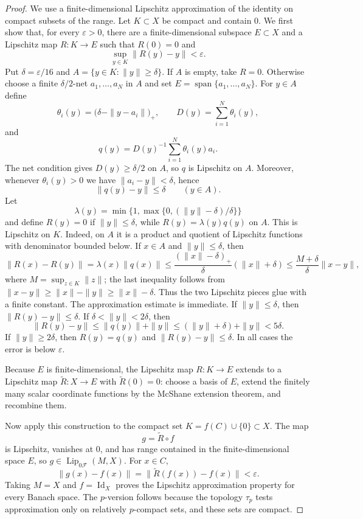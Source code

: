 \documentclass[11pt]{article}
\newcommand{\LipF}{\operatorname{Lip}_{0\mathcal F}}
\begin{document}
\begin{proof}
We use a finite-dimensional Lipschitz approximation of the identity on compact
subsets of the range. Let $K\subset X$ be compact and contain $0$. We first
show that, for every $\varepsilon>0$, there are a finite-dimensional subspace
$E\subset X$ and a Lipschitz map $R:K\to E$ such that $R(0)=0$ and
\[
        \sup_{y\in K}\|R(y)-y\|<\varepsilon .
\]
Put $\delta=\varepsilon/16$ and $A=\{y\in K:\|y\|\geq \delta\}$. If $A$ is
empty, take $R=0$. Otherwise choose a finite $\delta/2$-net
$a_1,\ldots,a_N$ in $A$ and set $E=\operatorname{span}\{a_1,\ldots,a_N\}$.
For $y\in A$ define
\[
 \theta_i(y)=\bigl(\delta-\|y-a_i\|\bigr)_+,\qquad
 D(y)=\sum_{i=1}^N\theta_i(y),
\]
and
\[
 q(y)=D(y)^{-1}\sum_{i=1}^N\theta_i(y)a_i .
\]
The net condition gives $D(y)\geq \delta/2$ on $A$, so $q$ is Lipschitz on
$A$. Moreover, whenever $\theta_i(y)>0$ we have $\|a_i-y\|<\delta$, hence
\[
        \|q(y)-y\|\leq \delta\qquad (y\in A).
\]
Let
\[
 \lambda(y)=\min\{1,\max\{0,(\|y\|-\delta)/\delta\}\}
\]
and define $R(y)=0$ if $\|y\|\leq\delta$, while $R(y)=\lambda(y)q(y)$ on
$A$. This is Lipschitz on $K$. Indeed, on $A$ it is a product and quotient of
Lipschitz functions with denominator bounded below. If $x\in A$ and
$\|y\|\leq\delta$, then
\[
 \|R(x)-R(y)\|=\lambda(x)\|q(x)\|
 \leq \frac{(\|x\|-\delta)_+}{\delta}(\|x\|+\delta)
 \leq \frac{M+\delta}{\delta}\|x-y\|,
\]
where $M=\sup_{z\in K}\|z\|$; the last inequality follows from
$\|x-y\|\geq\|x\|-\|y\|\geq \|x\|-\delta$. Thus the two Lipschitz pieces glue
with a finite constant. The approximation estimate is immediate. If
$\|y\|\leq\delta$, then $\|R(y)-y\|\leq\delta$.
If $\delta<\|y\|<2\delta$, then
\[
 \|R(y)-y\|\leq \|q(y)\|+\|y\|\leq (\|y\|+\delta)+\|y\|<5\delta.
\]
If $\|y\|\geq 2\delta$, then $R(y)=q(y)$ and $\|R(y)-y\|\leq\delta$. In all
cases the error is below $\varepsilon$.

Because $E$ is finite-dimensional, the Lipschitz map $R:K\to E$ extends to a
Lipschitz map $\widetilde R:X\to E$ with $\widetilde R(0)=0$: choose a basis
of $E$, extend the finitely many scalar coordinate functions by the McShane
extension theorem, and recombine them.

Now apply this construction to the compact set
$K=f(C)\cup\{0\}\subset X$. The map
\[
        g=\widetilde R\circ f
\]
is Lipschitz, vanishes at $0$, and has range contained in the finite-dimensional
space $E$, so $g\in\LipF(M,X)$. For $x\in C$,
\[
        \|g(x)-f(x)\|=\|\widetilde R(f(x))-f(x)\|<\varepsilon .
\]
Taking $M=X$ and $f=\operatorname{Id}_X$ proves the Lipschitz approximation
property for every Banach space. The $p$-version follows because the topology
$\tau_p$ tests approximation only on relatively $p$-compact sets, and these
sets are compact.
\end{proof}
\end{document}
